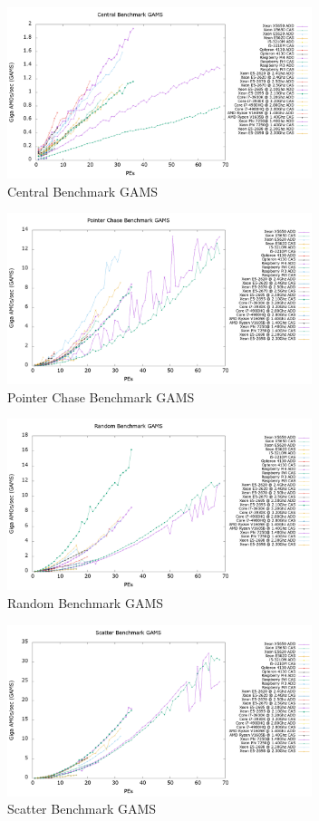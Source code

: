 \begin{figure}[!t]
\centering
\includegraphics[width=3.5in]{figures/CENTRAL_GAMS.png}
\caption{Central Benchmark GAMS}
\label{fig:central_gams}
\end{figure}

\begin{figure}[!t]
\centering
\includegraphics[width=3.5in]{figures/PTRCHASE_GAMS.png}
\caption{Pointer Chase Benchmark GAMS}
\label{fig:ptrchase_gams}
\end{figure}

\begin{figure}[!t]
\centering
\includegraphics[width=3.5in]{figures/RAND_GAMS.png}
\caption{Random Benchmark GAMS}
\label{fig:rand_gams}
\end{figure}

\begin{figure}[!t]
\centering
\includegraphics[width=3.5in]{figures/SCATTER_GAMS.png}
\caption{Scatter Benchmark GAMS}
\label{fig:scatter_gams}
\end{figure}

